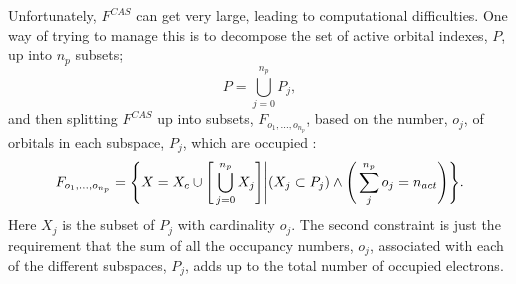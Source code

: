 \noindent Unfortunately, $F^{CAS}$ can get very large, leading to computational difficulties. 
One way of trying to manage this is to decompose the set of active orbital indexes, $P$, up into $n_{p}$ subsets;
\begin{equation}
P = \bigcup\limits_{j=0}^{n_{p}} P_{j}, 
\end{equation}
and then splitting $F^{CAS}$ up into subsets, $F_{o_{1},...,o_{n_{p}}}$, based on the 
number, $o_{j}$, of orbitals in each subspace, $P_{j}$, which are occupied : 
\begin{equation}
F_{o_{1},...,o_{n_{p}}} =
\Bigg{\{} X =   X_{c} \cup \Bigg{[} \bigcup\limits_{j=0}^{n_{p}} X_{j}\Bigg{]}
 \Bigg{|} ( X_{j} \subset P_{j} ) \wedge \Bigg{(} \sum_{j}^{n_{p}} o_{j}  = n_{act} \Bigg{)}\Bigg{\}} . 
\end{equation}
Here $X_{j}$ is the subset of $P_{j}$ with cardinality $o_{j}$. The second constraint
is just the requirement that the sum of all the occupancy numbers, $o_{j}$, associated
with each of the different subspaces, $P_{j}$, adds up to the total number of
occupied electrons.\\ 


